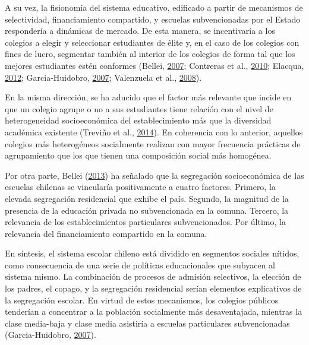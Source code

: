 \documentclass[
]{article}
\begin{document}
A su vez, la fisionomía del sistema educativo, edificado a partir de
mecanismos de selectividad, financiamiento compartido, y escuelas
subvencionadas por el Estado respondería a dinámicas de mercado. De esta
manera, se incentivaría a los colegios a elegir y seleccionar
estudiantes de élite y, en el caso de los colegios con fines de lucro,
segmentar también al interior de los colegios de forma tal que los
mejores estudiantes estén conformes (Bellei,
\protect\hyperlink{ref-bellei_expansion_2007}{2007}; Contreras et al.,
\protect\hyperlink{ref-contreras_when_2010}{2010}; Elacqua,
\protect\hyperlink{ref-elacqua_impact_2012}{2012}; Garcia-Huidobro,
\protect\hyperlink{ref-garcia-huidobro_desigualdad_2007}{2007};
Valenzuela et al.,
\protect\hyperlink{ref-valenzuela_evolucion_2008}{2008}).

En la misma dirección, se ha aducido que el factor más relevante que
incide en que un colegio agrupe o no a sus estudiantes tiene relación
con el nivel de heterogeneidad socioeconómica del establecimiento más
que la diversidad académica existente (Treviño et al.,
\protect\hyperlink{ref-trevino_segregacion_2014}{2014}). En coherencia
con lo anterior, aquellos colegios más heterogéneos socialmente realizan
con mayor frecuencia prácticas de agrupamiento que los que tienen una
composición social más homogénea.

Por otra parte, Bellei
(\protect\hyperlink{ref-bellei_estudio_2013}{2013}) ha señalado que la
segregación socioeconómica de las escuelas chilenas se vincularía
positivamente a cuatro factores. Primero, la elevada segregación
residencial que exhibe el país. Segundo, la magnitud de la presencia de
la educación privada no subvencionada en la comuna. Tercero, la
relevancia de los establecimientos particulares subvencionados. Por
último, la relevancia del financiamiento compartido en la comuna.

En síntesis, el sistema escolar chileno está dividido en segmentos
sociales nítidos, como consecuencia de una serie de políticas
educacionales que subyacen al sistema mismo. La combinación de procesos
de admisión selectivos, la elección de los padres, el copago, y la
segregación residencial serían elementos explicativos de la segregación
escolar. En virtud de estos mecanismos, los colegios públicos tenderían
a concentrar a la población socialmente más desaventajada, mientras la
clase media-baja y clase media asistiría a escuelas particulares
subvencionadas (Garcia-Huidobro,
\protect\hyperlink{ref-garcia-huidobro_desigualdad_2007}{2007}).
\end{document}
